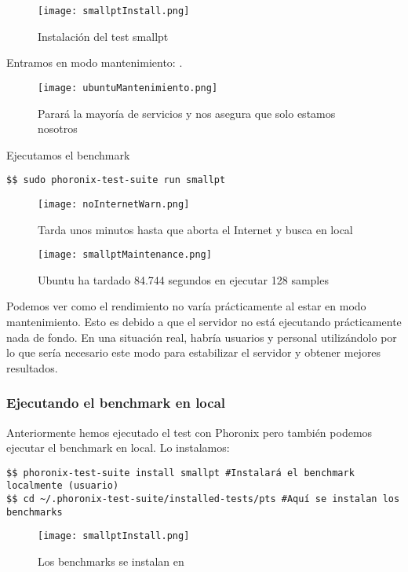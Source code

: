 \begin{figure}[H]
	\centering
	\texttt{[image: smallptInstall.png]}
	\caption{Instalación del test smallpt}
\end{figure}
Entramos en modo mantenimiento: .

\begin{figure}[H]
	\centering
	\texttt{[image: ubuntuMantenimiento.png]}
	\caption{Parará la mayoría de servicios y nos asegura que solo estamos nosotros}
\end{figure}

Ejecutamos el benchmark
\begin{verbatim}
$$ sudo phoronix-test-suite run smallpt
\end{verbatim}
\begin{figure}[H]
	\centering
	\texttt{[image: noInternetWarn.png]}
	\caption{Tarda unos minutos hasta que aborta el Internet y busca en local}
\end{figure}

\begin{figure}[H]
	\centering
	\texttt{[image: smallptMaintenance.png]}
	\caption{Ubuntu ha tardado 84.744 segundos en ejecutar 128 samples}
\end{figure}

Podemos ver como el rendimiento no varía prácticamente al estar en modo mantenimiento. Esto es debido a que el servidor no está ejecutando prácticamente nada de fondo. En una situación real, habría usuarios y personal utilizándolo por lo que sería necesario este modo para estabilizar el servidor y obtener mejores resultados.\\

\subsubsection{Ejecutando el benchmark en local}
Anteriormente hemos ejecutado el test con Phoronix pero también podemos ejecutar el benchmark en local. Lo instalamos:
\begin{verbatim}
$$ phoronix-test-suite install smallpt #Instalará el benchmark localmente (usuario)
$$ cd ~/.phoronix-test-suite/installed-tests/pts #Aquí se instalan los benchmarks
\end{verbatim}
\begin{figure}[H]
	\centering
	\texttt{[image: smallptInstall.png]}
	\caption{Los benchmarks se instalan en }
\end{figure}

